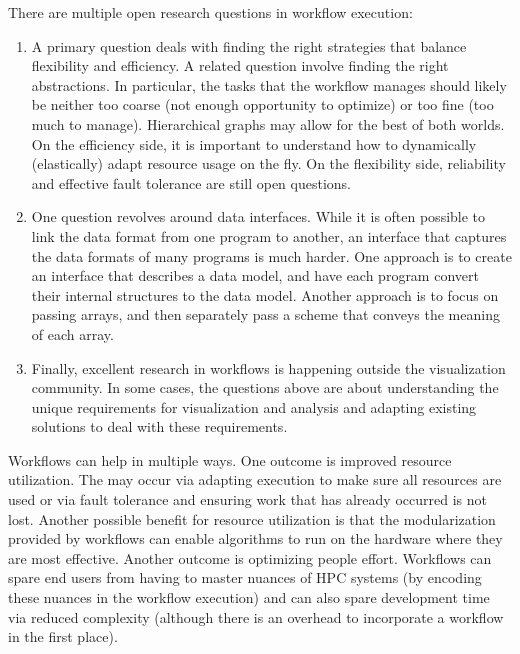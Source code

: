 \begin{refsection}
There are multiple open research questions in workflow execution:
\begin{enumerate}
\item	
A primary question deals with finding the right strategies that balance flexibility and efficiency.  A related question involve finding the right abstractions.  In particular, the tasks that the workflow manages should likely be neither too coarse (not enough opportunity to optimize) or too fine (too much to manage).   Hierarchical graphs may allow for the best of both worlds.  On the efficiency side, it is important to understand how to dynamically (elastically) adapt resource usage on the fly.  On the flexibility side, reliability and effective fault tolerance are still open questions. 
\item
One question revolves around data interfaces.  While it is often possible to link the data format from one program to another, an interface that captures the data formats of many programs is much harder.  One approach is to create an interface that describes a data model, and have each program convert their internal structures to the data model.  Another approach is to focus on passing arrays, and then separately pass a scheme that conveys the meaning of each array.
\item
Finally, excellent research in workflows is happening outside the visualization community.  In some cases, the questions above are about understanding the unique requirements for visualization and analysis and adapting existing solutions to deal with these requirements.
\end{enumerate}

Workflows can help in multiple ways.  One outcome is improved resource utilization. The may occur via adapting execution to make sure all resources are used or via fault tolerance and ensuring work that has already occurred is not lost.  Another possible benefit for resource utilization is that the modularization provided by workflows can enable algorithms to run on the hardware where they are most effective. Another outcome is optimizing people effort.  Workflows can spare end users from having to master nuances of HPC systems (by encoding these nuances in the workflow execution) and can also spare development time via reduced complexity (although there is an overhead to incorporate a workflow in the first place).  

\printbibliography
\end{refsection}
